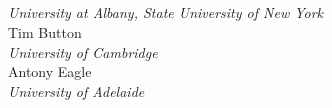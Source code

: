 \thispagestyle{empty}

~\\[4cm]
\begin{center}\forallxadl \end{center}
\newpage \thispagestyle{empty} ~\\
\newpage \thispagestyle{empty}
~\\[2cm]
\noindent {}

\vfill


\\
\emph{University at Albany, State University of New York}\\[1.5cm]

{Tim Button}\\
\emph{University of Cambridge}\\[1.5cm]

{Antony Eagle}\\
\emph{University of Adelaide}



\newpage
\thispagestyle{empty}%

